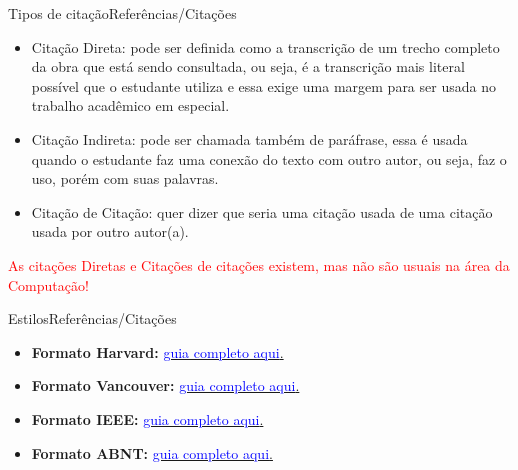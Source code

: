 \documentclass[t]{beamer}
\begin{document}

\begin{ftst}{Tipos de citação}{Referências/Citações}
\justifying

\begin{itemize}
    \item Citação Direta: pode ser definida como a transcrição de um trecho completo da obra que está sendo consultada, ou seja, é a transcrição mais literal possível que o estudante utiliza e essa exige uma margem para ser usada no trabalho acadêmico em especial.
    \vone
    \item Citação Indireta: pode ser chamada também de paráfrase, essa é usada quando o estudante faz uma conexão do texto com outro autor, ou seja, faz o uso, porém com suas palavras.
    \vone
    \item Citação de Citação: quer dizer que seria uma citação usada de uma citação usada por outro autor(a).
\end{itemize}
\vone
\centering
\textcolor{red}{As citações Diretas e Citações de citações existem, mas não são usuais na área da Computação!}

\end{ftst}


\begin{ftst}{Estilos}{Referências/Citações}
\justifying
\begin{itemize}
    \item \textbf{Formato Harvard:} \href{https://www.mendeley.com/guides/harvard-citation-guide}{\textcolor{blue}{guia completo aqui}.}
    \vone
    \item \textbf{Formato Vancouver:} \href{https://guides.lib.monash.edu/citing-referencing/vancouver}{\textcolor{blue}{guia completo aqui}.}
    \vone
    \item \textbf{Formato IEEE:} \href{https://journals.ieeeauthorcenter.ieee.org/your-role-in-article-production/ieee-editorial-style-manual/}{\textcolor{blue}{guia completo aqui}.}
    \vone
    \item \textbf{Formato ABNT:} \href{https://www.ufpe.br/documents/40070/1837975/ABNT+NBR+6023+2018+\%281\%29.pdf/3021f721-5be8-4e6d-951b-fa354dc490ed}{\textcolor{blue}{guia completo aqui}.}
\end{itemize}



\end{ftst}
\end{document}
